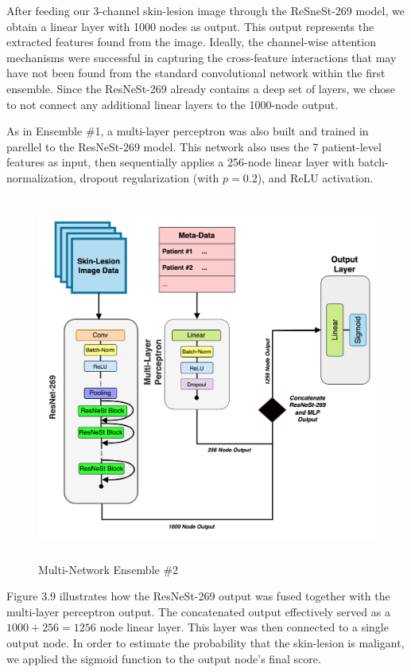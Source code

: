 \documentclass [MAS] {uclathes}
\begin{document}
After feeding our 3-channel skin-lesion image through the ReSneSt-269 model, we obtain a linear layer with 1000 nodes as output. This output represents the extracted features found from the image. Ideally, the channel-wise attention mechanisms were successful in capturing the cross-feature interactions that may have not been found from the standard convolutional network within the first ensemble. Since the ResNeSt-269 already contains a deep set of layers, we chose to not connect any additional linear layers to the 1000-node output.

As in Ensemble \#1,  a multi-layer perceptron was also built and trained in parellel to the ResNeSt-269 model. This network also uses the 7 patient-level features as input, then sequentially applies a 256-node linear layer with batch-normalization, dropout regularization (with $p=0.2$), and ReLU activation.


\begin{figure}[h]
\centering
\includegraphics[height = 120mm, width= 140mm]{imgs/ens2_arch.png}
\caption{Multi-Network Ensemble \#2}
\label{fig:ens2_arch}
\end{figure}

Figure 3.9 illustrates how the ResNeSt-269 output was fused together with the multi-layer perceptron output. The concatenated output effectively served as a $1000+256 = 1256$ node linear layer. This layer was then connected to a single output node. In order to estimate the probability that the skin-lesion is maligant, we applied the sigmoid function to the output node's final score.
\end{document}
